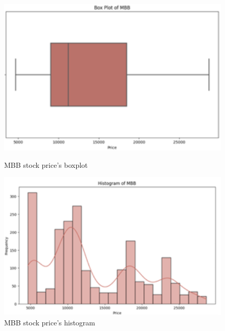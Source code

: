 \documentclass{ieeeojies}
\begin{document}
\begin{figure}[H]
    \centering
    \begin{minipage}{0.23\textwidth}
    \centering
    \includegraphics[width=1\textwidth]{bibliography/Figure/MBboxplot.png}
    \caption{MBB stock price's boxplot}
    \label{fig:1}
    \end{minipage}
    \hfill
    \begin{minipage}{0.23\textwidth}
    \centering
    \includegraphics[width=1\textwidth]{bibliography/Figure/MBBhist.png}
    \caption{MBB stock price's histogram}
    \label{fig:2}
    \end{minipage}
\end{figure}
\end{document}
